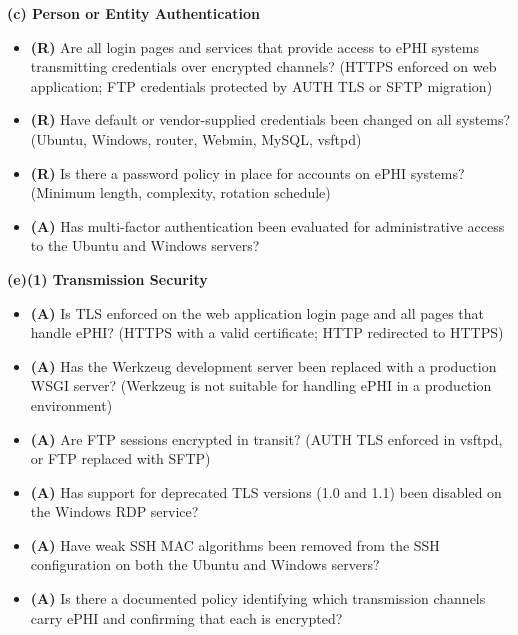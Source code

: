 \documentclass[12pt]{article}
\newcommand{\hipbadge}[2]{%
  \colorbox{#1}{\color{white}\textbf{\small #2}}%
}
\newcommand{\cbox}{\ding{113}\;}
\begin{document}
\bigskip
 
\noindent\hipbadge{authcol}{(c) Person or Entity Authentication}
 
\begin{checklistbox}
\begin{itemize}[leftmargin=1.5em, label=\cbox, itemsep=4pt]
  \item \textbf{(R)} Are all login pages and services that provide access
    to ePHI systems transmitting credentials over encrypted channels?
    (HTTPS enforced on web application; FTP credentials protected by
    AUTH TLS or SFTP migration)
  \item \textbf{(R)} Have default or vendor-supplied credentials been
    changed on all systems? (Ubuntu, Windows, router, Webmin, MySQL,
    vsftpd)
  \item \textbf{(R)} Is there a password policy in place for accounts on
    ePHI systems? (Minimum length, complexity, rotation schedule)
  \item \textbf{(A)} Has multi-factor authentication been evaluated for
    administrative access to the Ubuntu and Windows servers?
\end{itemize}
\end{checklistbox}
 
\bigskip
 
\noindent\hipbadge{transcol}{(e)(1) Transmission Security}
 
\begin{checklistbox}
\begin{itemize}[leftmargin=1.5em, label=\cbox, itemsep=4pt]
  \item \textbf{(A)} Is TLS enforced on the web application login page and
    all pages that handle ePHI? (HTTPS with a valid certificate; HTTP
    redirected to HTTPS)
  \item \textbf{(A)} Has the Werkzeug development server been replaced with
    a production WSGI server? (Werkzeug is not suitable for handling ePHI
    in a production environment)
  \item \textbf{(A)} Are FTP sessions encrypted in transit? (AUTH TLS
    enforced in vsftpd, or FTP replaced with SFTP)
  \item \textbf{(A)} Has support for deprecated TLS versions (1.0 and 1.1)
    been disabled on the Windows RDP service?
  \item \textbf{(A)} Have weak SSH MAC algorithms been removed from the
    SSH configuration on both the Ubuntu and Windows servers?
  \item \textbf{(A)} Is there a documented policy identifying which
    transmission channels carry ePHI and confirming that each is
    encrypted?
\end{itemize}
\end{checklistbox}
 
\end{document}
